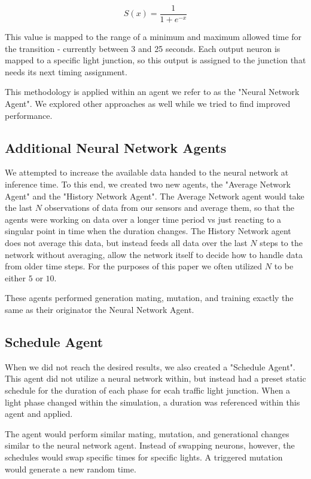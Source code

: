 \documentclass[twocolumn]{article}
\begin{document}
\begin{equation} 
    S(x) = \frac{1}{1 + e^{-x}}
\end{equation}

This value is mapped to the range of a minimum and maximum allowed time for the transition - currently between 3 and 25 seconds. Each output neuron is mapped to a specific light junction, so this output is assigned to the junction that needs its next timing assignment.

This methodology is applied within an agent we refer to as the "Neural Network Agent". We explored other approaches as well while we tried to find improved performance.

\subsection{Additional Neural Network Agents} \label{NN_subsection}

We attempted to increase the available data handed to the neural network at inference time. To this end, we created two new agents, the "Average Network Agent" and the "History Network Agent". The Average Network agent would take the last $N$ observations of data from our sensors and average them, so that the agents were working on data over a longer time period vs just reacting to a singular point in time when the duration changes. The History Network agent does not average this data, but instead feeds all data over the last $N$ steps to the network without averaging, allow the network itself to decide how to handle data from older time steps. For the purposes of this paper we often utilized $N$ to be either $5$ or $10$.

These agents performed generation mating, mutation, and training exactly the same as their originator the Neural Network Agent.

\subsection{Schedule Agent} \label{NN_subsection}

When we did not reach the desired results, we also created a "Schedule Agent". This agent did not utilize a neural network within, but instead had a preset static schedule for the duration of each phase for ecah traffic light junction. When a light phase changed within the simulation, a duration was referenced within this agent and applied.

The agent would perform similar mating, mutation, and generational changes similar to the neural network agent. Instead of swapping neurons, however, the schedules would swap specific times for specific lights. A triggered mutation would generate a new random time.
\end{document}
